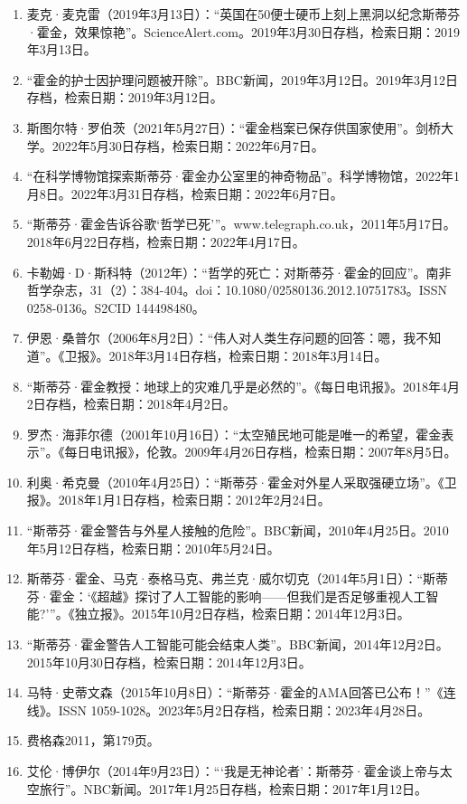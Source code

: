 \begin{enumerate}
\item 麦克·麦克雷（2019年3月13日）：“英国在50便士硬币上刻上黑洞以纪念斯蒂芬·霍金，效果惊艳”。ScienceAlert.com。2019年3月30日存档，检索日期：2019年3月13日。
\item “霍金的护士因护理问题被开除”。BBC新闻，2019年3月12日。2019年3月12日存档，检索日期：2019年3月12日。
\item 斯图尔特·罗伯茨（2021年5月27日）：“霍金档案已保存供国家使用”。剑桥大学。2022年5月30日存档，检索日期：2022年6月7日。
\item “在科学博物馆探索斯蒂芬·霍金办公室里的神奇物品”。科学博物馆，2022年1月8日。2022年3月31日存档，检索日期：2022年6月7日。
\item “斯蒂芬·霍金告诉谷歌‘哲学已死’”。www.telegraph.co.uk，2011年5月17日。2018年6月22日存档，检索日期：2022年4月17日。
\item 卡勒姆·D·斯科特（2012年）：“哲学的死亡：对斯蒂芬·霍金的回应”。南非哲学杂志，31（2）：384-404。doi：10.1080/02580136.2012.10751783。ISSN 0258-0136。S2CID 144498480。
\item 伊恩·桑普尔（2006年8月2日）：“伟人对人类生存问题的回答：嗯，我不知道”。《卫报》。2018年3月14日存档，检索日期：2018年3月14日。
\item “斯蒂芬·霍金教授：地球上的灾难几乎是必然的”。《每日电讯报》。2018年4月2日存档，检索日期：2018年4月2日。
\item 罗杰·海菲尔德（2001年10月16日）：“太空殖民地可能是唯一的希望，霍金表示”。《每日电讯报》，伦敦。2009年4月26日存档，检索日期：2007年8月5日。
\item 利奥·希克曼（2010年4月25日）：“斯蒂芬·霍金对外星人采取强硬立场”。《卫报》。2018年1月1日存档，检索日期：2012年2月24日。
\item “斯蒂芬·霍金警告与外星人接触的危险”。BBC新闻，2010年4月25日。2010年5月12日存档，检索日期：2010年5月24日。
\item 斯蒂芬·霍金、马克·泰格马克、弗兰克·威尔切克（2014年5月1日）：“斯蒂芬·霍金：‘《超越》探讨了人工智能的影响——但我们是否足够重视人工智能?’”。《独立报》。2015年10月2日存档，检索日期：2014年12月3日。
\item “斯蒂芬·霍金警告人工智能可能会结束人类”。BBC新闻，2014年12月2日。2015年10月30日存档，检索日期：2014年12月3日。
\item 马特·史蒂文森（2015年10月8日）：“斯蒂芬·霍金的AMA回答已公布！”《连线》。ISSN 1059-1028。2023年5月2日存档，检索日期：2023年4月28日。
\item 费格森2011，第179页。
\item 艾伦·博伊尔（2014年9月23日）：“‘我是无神论者’：斯蒂芬·霍金谈上帝与太空旅行”。NBC新闻。2017年1月25日存档，检索日期：2017年1月12日。

\end{enumerate}
